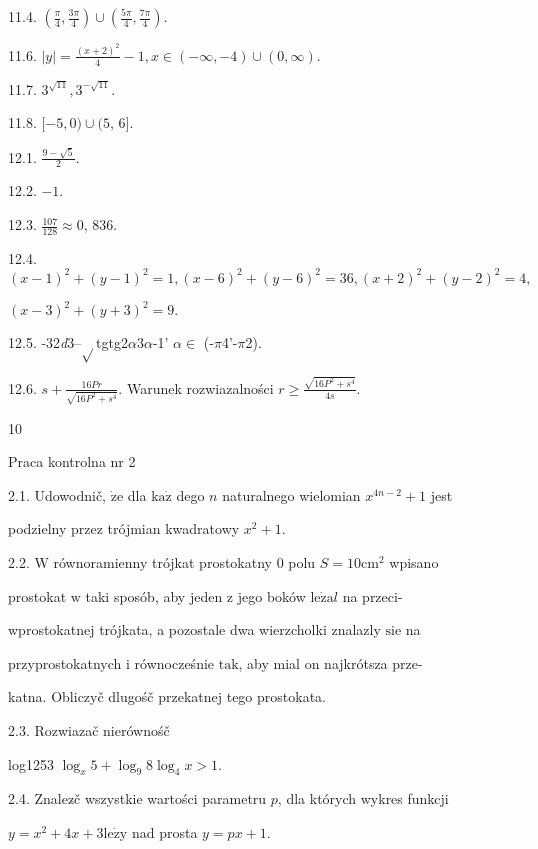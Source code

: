 \documentclass[a4paper,12pt]{article}
\begin{document}
11.4. $(\displaystyle \frac{\pi}{4},\frac{3\pi}{4})\cup(\frac{5\pi}{4},\frac{7\pi}{4}).$

11.6. $|y|=\displaystyle \frac{(x+2)^{2}}{4}-1, x\in(-\infty,-4)\cup(0,\infty).$

11.7. $3^{\sqrt{11}}, 3^{-\sqrt{11}}.$

11.8. $[-5,0)\cup(5$, 6$].$

12.1. $\displaystyle \frac{9-\sqrt{5}}{2}.$

12.2. $-1.$

12.3. $\displaystyle \frac{107}{128}\approx 0$, 836.

12.4. $(x-1)^{2}+(y-1)^{2}=1, (x-6)^{2}+(y-6)^{2}=36, (x+2)^{2}+(y-2)^{2}=4,$

$(x-3)^{2}+(y+3)^{2}=9.$

12.5. -32{\it d}3--$\sqrt{}$tgtg2$\alpha$3$\alpha$-1' $\alpha\in$ (-$\pi$4'-$\pi$2).

12.6. $s+\displaystyle \frac{16Pr}{\sqrt{16P^{2}+s^{4}}}$. Warunek rozwiazalności $r\displaystyle \geq\frac{\sqrt{16P^{2}+s^{4}}}{4s}.$





10

Praca kontrolna nr 2

2.1. Udowodnič, $\dot{\mathrm{z}}\mathrm{e}$ dla $\mathrm{k}\mathrm{a}\dot{\mathrm{z}}$ dego $n$ naturalnego wielomian $x^{4n-2}+1$ jest

podzielny przez trójmian kwadratowy $x^{2}+1.$

2.2. $\mathrm{W}$ równoramienny trójkat prostokatny $0$ polu $S = 10\mathrm{c}\mathrm{m}^{2}$ wpisano

prostokat $\mathrm{w}$ taki sposób, aby jeden $\mathrm{z}$ jego boków $\mathrm{l}\mathrm{e}\dot{\mathrm{z}}\mathrm{a}l$ na przeci-

wprostokatnej trójkata, a pozostale dwa wierzcholki znalazly $\mathrm{s}\mathrm{i}\mathrm{e}$ na

przyprostokatnych $\mathrm{i}$ równocześnie $\mathrm{t}\mathrm{a}\mathrm{k}$, aby mial on najkrótsza prze-

katna. Obliczyč dlugośč przekatnej tego prostokata.

2.3. Rozwiazač nierównośč

log1253 $\log_{x}5+\log_{9}8\log_{4}x>1.$

2.4. Znalez$\acute{}$č wszystkie wartości parametru $p$, dla których wykres funkcji

$y=x^{2}+4x+3\mathrm{l}\mathrm{e}\dot{\mathrm{z}}\mathrm{y}$ nad prosta $y=px+1.$
\end{document}
